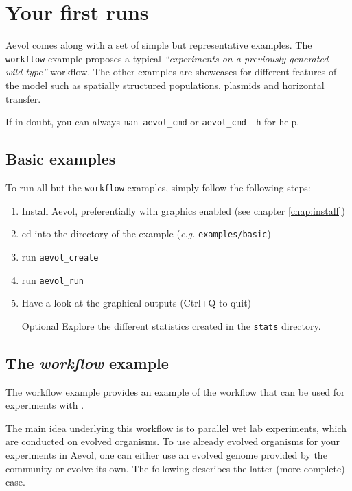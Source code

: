 \chapter{Your first \aevol{} runs}
\label{chap:first-runs}


\vspace{5mm}

Aevol comes along with a set of simple but representative examples. The \verb?workflow? example proposes a typical \emph{``experiments on a previously generated wild-type''} workflow. The other examples are showcases for different features of the model such as spatially structured populations, plasmids and horizontal transfer.

If in doubt, you can always \verb?man aevol_cmd? or \verb?aevol_cmd -h? for help.


\section{Basic examples}

To run all but the \verb?workflow? examples, simply follow the following steps:

\begin{enumerate}
\item Install Aevol, preferentially with graphics enabled (see chapter \ref{chap:install})
\item cd into the directory of the example (\emph{e.g.} \verb?examples/basic?)
\item
run \verb?aevol_create?
\item
run \verb?aevol_run?
\item Have a look at the graphical outputs (Ctrl+Q to quit)
\item [Optional] Explore the different statistics created in the \verb?stats? directory.
\end{enumerate}


\section{The \emph{workflow} example}

The workflow example provides an example of the workflow that can be used for experiments with \aevol{}.

The main idea underlying this workflow is to parallel wet lab experiments, which are conducted on evolved organisms.
To use already evolved organisms for your experiments in Aevol, one can either use an evolved genome provided by the community or evolve its own. The following describes the latter (more complete) case.


